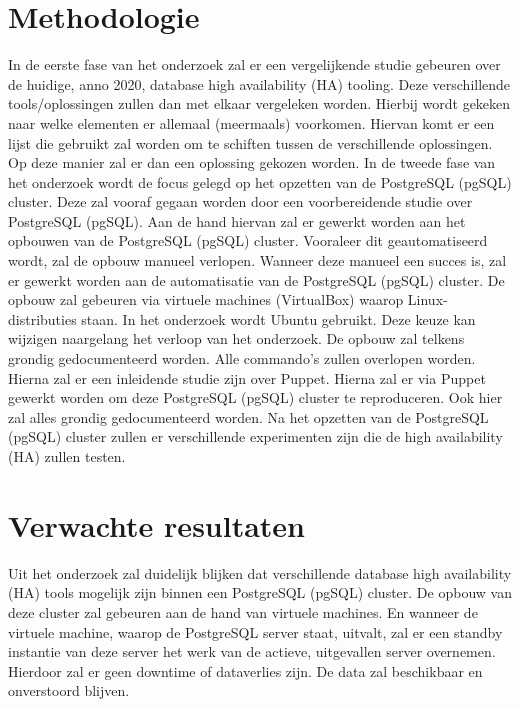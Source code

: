 \section{Methodologie}
\label{sec:methodologie}
In de eerste fase van het onderzoek zal er een vergelijkende studie gebeuren over de huidige, anno 2020, database high availability (HA) tooling. Deze verschillende tools/oplossingen zullen dan met elkaar vergeleken worden. Hierbij wordt gekeken naar welke elementen er allemaal (meermaals) voorkomen. Hiervan komt er een lijst die gebruikt zal worden om te schiften tussen de verschillende oplossingen. Op deze manier zal er dan een oplossing gekozen worden.  In de tweede fase van het onderzoek wordt de focus gelegd op het opzetten van de PostgreSQL (pgSQL) cluster. Deze zal vooraf gegaan worden door een voorbereidende studie over PostgreSQL (pgSQL). Aan de hand hiervan zal er gewerkt worden aan het opbouwen van de PostgreSQL (pgSQL) cluster. Vooraleer dit geautomatiseerd wordt, zal de opbouw manueel verlopen. Wanneer deze manueel een succes is, zal er gewerkt worden aan de automatisatie van de PostgreSQL (pgSQL) cluster. De opbouw zal gebeuren via virtuele machines (VirtualBox) waarop Linux-distributies staan. In het onderzoek wordt Ubuntu gebruikt. Deze keuze kan wijzigen naargelang het verloop van het onderzoek. De opbouw zal telkens grondig gedocumenteerd worden. Alle commando's zullen overlopen worden. Hierna zal er een inleidende studie zijn over Puppet. Hierna zal er via Puppet gewerkt worden om deze PostgreSQL (pgSQL) cluster te reproduceren. Ook hier zal alles grondig gedocumenteerd worden.
Na het opzetten van de PostgreSQL (pgSQL) cluster zullen er verschillende experimenten zijn die de high availability (HA) zullen testen.





\section{Verwachte resultaten}
\label{sec:verwachte_resultaten}
Uit het onderzoek zal duidelijk blijken dat verschillende database high availability (HA) tools mogelijk zijn binnen een PostgreSQL (pgSQL) cluster. De opbouw van deze cluster zal gebeuren aan de hand van virtuele machines. En wanneer de virtuele machine, waarop de PostgreSQL server staat, uitvalt, zal er een standby instantie van deze server het werk van de actieve, uitgevallen server overnemen. Hierdoor zal er geen downtime of dataverlies zijn. De data zal beschikbaar en onverstoord blijven.


